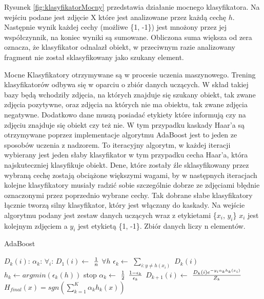 Rysunek \ref{fig:klasyfikatorMocny} przedstawia działanie mocnego klasyfikatora. Na wejściu podane jest zdjęcie X które jest analizowane przez każdą cechę $h$. Następnie wynik każdej cechy (możliwe \{1, -1\}) jest mnożony przez jej współczynnik, na koniec wyniki są sumowane. Obliczona suma większa od zera oznacza, że klasyfikator odnalazł obiekt, w przeciwnym razie analizowany fragment nie został sklasyfikowany jako szukany element.

Mocne Klasyfikatory otrzymywane są w procesie uczenia maszynowego. Trening klasyfikatorów odbywa się w oparciu o zbiór danych uczących. W skład takiej bazy będą wchodziły zdjęcia, na których znajduje się szukany obiekt, tak zwane zdjęcia pozytywne, oraz zdjęcia na których nie ma obiektu, tak zwane zdjęcia negatywne. Dodatkowo dane muszą posiadać etykiety które informują czy na zdjęciu znajduje się obiekt czy też nie. W tym przypadku kaskady Haar’a są otrzymywane poprzez implementacje algorytmu AdaBoost jest to jeden ze sposobów uczenia z nadzorem. To iteracyjny algorytm, w każdej iteracji wybierany  jest jeden słaby klasyfikator w tym przypadku cecha Haar’a, która najskuteczniej klasyfikuje obiekt. Dene, które zostały źle sklasyfikowany przez wybraną cechę zostają obciążone większymi wagami, by w następnych iteracjach kolejne klasyfikatory musiały radzić sobie szczególnie dobrze ze zdjęciami błędnie oznaczonymi przez poprzednio wybrane cechy. Tak dobrane słabe klasyfikatory łącznie tworzą silny klasyfikator, który jest włączany do kaskady. Na wejście algorytmu podany jest zestaw danych uczących wraz z etykietami \{$x_{i}$, $y_{i}$\} $x_{i}$ jest kolejnym zdjęciem a $y_{i}$ jest etykietą \{1, -1\}. Zbiór danych liczy n elementów.

\begin{algorithm}[H]
	\caption{AdaBoost}\label{adaBoost}
	\begin{algorithmic} 
		\DontPrintSemicolon
		\STATE $D_k(i)$: 
		\STATE $\alpha_k$:
		\STATE $\forall_i$: $D_1(i) \gets$ ${1} \over {n}$ 
		\STATE $\forall h$ $\epsilon_k \gets$ $\sum_{i:y\neq h(x_i)}^{} $ $D_k(i)$ 
		\STATE $h_k \gets argmin(\epsilon_k(h))$ 
		\STATE stop 
		\ELSE
		\STATE $\alpha_k \gets $ $1 \over 2$ $1- \epsilon_k \over \epsilon_k$
		\STATE $D_{k+1}(i) \gets$ $D_k(i)e^{-y_i\alpha_k h_k(x_i)} \over Z_k$
		\ENDIF
		\ENDFOR
		\STATE $H_{final}(x) = sgn(\sum_{k=1}^{K} \alpha_k h_k(x))$
	\end{algorithmic}
\end{algorithm}

